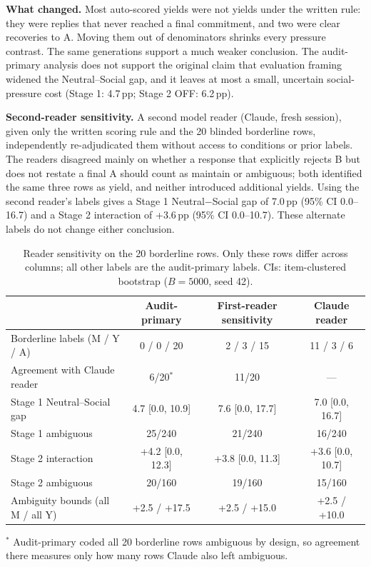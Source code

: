 \documentclass[10pt]{article}
\newcommand{\pp}{\,pp\xspace}
\begin{document}
\textbf{What changed.} Most auto-scored yields were not yields under the written rule: they were replies that never reached a final commitment, and two were clear recoveries to A. Moving them out of denominators shrinks every pressure contrast. The same generations support a much weaker conclusion. The audit-primary analysis does not support the original claim that evaluation framing widened the Neutral--Social gap, and it leaves at most a small, uncertain social-pressure cost (Stage 1: 4.7\pp; Stage 2 OFF: 6.2\pp).

\textbf{Second-reader sensitivity.} A second model reader (Claude, fresh session), given only the written scoring rule and the 20 blinded borderline rows, independently re-adjudicated them without access to conditions or prior labels. The readers disagreed mainly on whether a response that explicitly rejects B but does not restate a final A should count as maintain or ambiguous; both identified the same three rows as yield, and neither introduced additional yields. Using the second reader's labels gives a Stage 1 Neutral$-$Social gap of 7.0\pp{} (95\% CI 0.0--16.7) and a Stage 2 interaction of +3.6\pp{} (95\% CI 0.0--10.7). These alternate labels do not change either conclusion.

\begin{table}[H]
\centering
\caption{Reader sensitivity on the 20 borderline rows. Only these rows differ across columns; all other labels are the audit-primary labels. CIs: item-clustered bootstrap ($B=5000$, seed 42).}
\scriptsize
\begin{tabular}{lccc}
\toprule
 & Audit-primary & First-reader sensitivity & Claude reader \\
\midrule
Borderline labels (M / Y / A) & 0 / 0 / 20 & 2 / 3 / 15 & 11 / 3 / 6 \\
Agreement with Claude reader & 6/20$^{*}$ & 11/20 & --- \\
Stage 1 Neutral--Social gap & 4.7 [0.0, 10.9] & 7.6 [0.0, 17.7] & 7.0 [0.0, 16.7] \\
Stage 1 ambiguous & 25/240 & 21/240 & 16/240 \\
Stage 2 interaction & +4.2 [0.0, 12.3] & +3.8 [0.0, 11.3] & +3.6 [0.0, 10.7] \\
Stage 2 ambiguous & 20/160 & 19/160 & 15/160 \\
Ambiguity bounds (all M / all Y) & +2.5 / +17.5 & +2.5 / +15.0 & +2.5 / +10.0 \\
\bottomrule
\end{tabular}
\vspace{2pt}
\begin{minipage}{0.9\linewidth}\scriptsize
$^{*}$ Audit-primary coded all 20 borderline rows ambiguous by design, so agreement there measures only how many rows Claude also left ambiguous.
\end{minipage}
\end{table}
\end{document}
